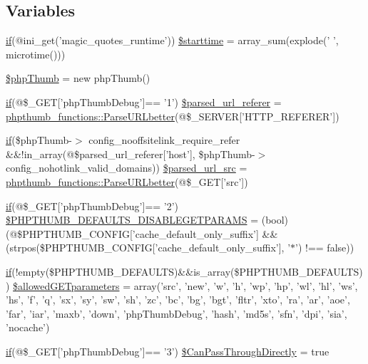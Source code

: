 \subsection*{\-Variables}
\begin{DoxyCompactItemize}
\item 
\hyperlink{_setup_8inc_8php_ad0184337b31d13763ec8751feff4aabe}{if}(@ini\-\_\-get('magic\-\_\-quotes\-\_\-runtime')) \hyperlink{php_thumb_8php_a21d98a10797e2b2d5b826d42a0fc9cbf}{\$starttime} = array\-\_\-sum(explode(' ', microtime()))
\item 
\hyperlink{php_thumb_8php_a1102b627fc78f79861c9271417c605c5}{\$php\-Thumb} = new php\-Thumb()
\item 
\hyperlink{_setup_8inc_8php_ad0184337b31d13763ec8751feff4aabe}{if}(@\$\-\_\-\-G\-E\-T\mbox{[}'php\-Thumb\-Debug'\mbox{]}== '1') \hyperlink{php_thumb_8php_ac4860cc4cf36c1934eaa5362310af460}{\$parsed\-\_\-url\-\_\-referer} = \hyperlink{classphpthumb__functions_ad7ede725cfcb053c5dbd50308deca6cd}{phpthumb\-\_\-functions\-::\-Parse\-U\-R\-Lbetter}(@\$\-\_\-\-S\-E\-R\-V\-E\-R\mbox{[}'\-H\-T\-T\-P\-\_\-\-R\-E\-F\-E\-R\-E\-R'\mbox{]})
\item 
\hyperlink{_setup_8inc_8php_ad0184337b31d13763ec8751feff4aabe}{if}(\$php\-Thumb-\/$>$\*
config\-\_\-nooffsitelink\-\_\-require\-\_\-refer \*
\&\&!in\-\_\-array(@\$parsed\-\_\-url\-\_\-referer\mbox{[}'host'\mbox{]}, \*
\$php\-Thumb-\/$>$\*
config\-\_\-nohotlink\-\_\-valid\-\_\-domains)) \hyperlink{php_thumb_8php_a34e071823656d093df510c217363bb61}{\$parsed\-\_\-url\-\_\-src} = \hyperlink{classphpthumb__functions_ad7ede725cfcb053c5dbd50308deca6cd}{phpthumb\-\_\-functions\-::\-Parse\-U\-R\-Lbetter}(@\$\-\_\-\-G\-E\-T\mbox{[}'src'\mbox{]})
\item 
\hyperlink{_setup_8inc_8php_ad0184337b31d13763ec8751feff4aabe}{if}(@\$\-\_\-\-G\-E\-T\mbox{[}'php\-Thumb\-Debug'\mbox{]}== '2') \hyperlink{php_thumb_8php_a173fd7202f9dac3c9d2e2fc80c512940}{\$\-P\-H\-P\-T\-H\-U\-M\-B\-\_\-\-D\-E\-F\-A\-U\-L\-T\-S\-\_\-\-D\-I\-S\-A\-B\-L\-E\-G\-E\-T\-P\-A\-R\-A\-M\-S} = (bool) (@\$\-P\-H\-P\-T\-H\-U\-M\-B\-\_\-\-C\-O\-N\-F\-I\-G\mbox{[}'cache\-\_\-default\-\_\-only\-\_\-suffix'\mbox{]} \&\& (strpos(\$\-P\-H\-P\-T\-H\-U\-M\-B\-\_\-\-C\-O\-N\-F\-I\-G\mbox{[}'cache\-\_\-default\-\_\-only\-\_\-suffix'\mbox{]}, '$\ast$') !== false))
\item 
\hyperlink{_setup_8inc_8php_ad0184337b31d13763ec8751feff4aabe}{if}(!empty(\$\-P\-H\-P\-T\-H\-U\-M\-B\-\_\-\-D\-E\-F\-A\-U\-L\-T\-S)\&\&is\-\_\-array(\$\-P\-H\-P\-T\-H\-U\-M\-B\-\_\-\-D\-E\-F\-A\-U\-L\-T\-S)) \hyperlink{php_thumb_8php_ae43c190c11f16793628da099e45ed3ee}{\$allowed\-G\-E\-Tparameters} = array('src', 'new', 'w', 'h', 'wp', 'hp', 'wl', 'hl', 'ws', 'hs', 'f', 'q', 'sx', 'sy', 'sw', 'sh', 'zc', 'bc', 'bg', 'bgt', 'fltr', 'xto', 'ra', 'ar', 'aoe', 'far', 'iar', 'maxb', 'down', 'php\-Thumb\-Debug', 'hash', 'md5s', 'sfn', 'dpi', 'sia', 'nocache')
\item 
\hyperlink{_setup_8inc_8php_ad0184337b31d13763ec8751feff4aabe}{if}(@\$\-\_\-\-G\-E\-T\mbox{[}'php\-Thumb\-Debug'\mbox{]}== '3') \hyperlink{php_thumb_8php_a5b2c559ec858186c5929b449bef74811}{\$\-Can\-Pass\-Through\-Directly} = true
\end{DoxyCompactItemize}


